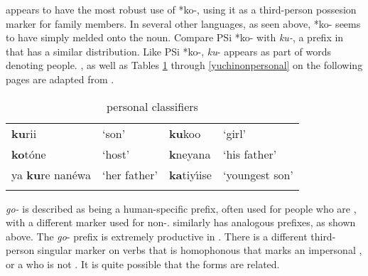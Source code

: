 \documentclass[output=paper]{LSP/langsci}
\begin{document}
 appears to have the most robust use of *ko-, using it as a third-person possesion marker for family members. In several other languages, as seen above, *ko- seems to have simply melded onto the noun. Compare PSi *ko- with \emph{ku-}, a prefix in  that has a similar distribution. Like PSi *ko-,  \emph{ku}- appears as part of words denoting people. , as well as Tables \ref{catawbaclassifiers} through \ref{yuchinonpersonal} on the following pages are adapted from \citet{Rankin1998scy}.

\begin{table}  
\caption{ personal classifiers} \label{catawbaclassifiers}
    \begin{tabularx}{.75\textwidth}{XXXX}\lsptoprule
        \textbf{ku}rii & `son' & \textbf{ku}koo & `girl' \\ 
        \textbf{ko}t\'one & `host' & \textbf{k\textipa{@}}neyana & `his father' \\ 
			{ya \textbf{ku}re nan\'ewa} & `her father' & {\textbf{ka}tiy\'\i ise} & `youngest son' \\
\lspbottomrule
    \end{tabularx} 
\end{table}

\begin{table} 

\end{table}

 \textit{go-} is described as being a human-specific prefix, often used for people who are , with a different marker used for non-.  similarly has analogous prefixes, as shown above. The \emph{go}- prefix is extremely productive in . There is a different third-person singular marker on verbs that is homophonous that marks an impersonal , or a  who is not . It is quite possible that the forms are related.
\end{document}
